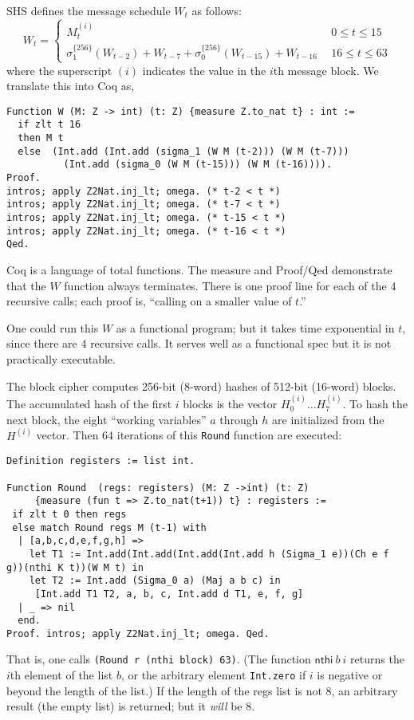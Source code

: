 \documentclass[prodmode,acmtoplas]{acmsmall}
\begin{document}
SHS defines the message schedule $W_t$ as follows:
\[
W_t = \left\{ \begin{array}{ll} M_t^{(i)} & ~~0 \le t \le 15 \\[1ex]
\sigma_1^{\{256\}}(W_{t-2}) + W_{t-7} +
\sigma_0^{\{256\}}(W_{t-15}) + W_{t-16}
      & ~~16 \le t \le 63
\end{array}
\right.
\]
where the superscript $(i)$ indicates
the value in the $i$th message block.
We translate this into Coq as,
\begin{lstlisting}
Function W (M: Z -> int) (t: Z) {measure Z.to_nat t} : int :=
  if zlt t 16 
  then M t 
  else  (Int.add (Int.add (sigma_1 (W M (t-2))) (W M (t-7)))
          (Int.add (sigma_0 (W M (t-15))) (W M (t-16)))).
Proof.
intros; apply Z2Nat.inj_lt; omega. (* t-2 < t *)
intros; apply Z2Nat.inj_lt; omega. (* t-7 < t *)
intros; apply Z2Nat.inj_lt; omega. (* t-15 < t *)
intros; apply Z2Nat.inj_lt; omega. (* t-16 < t *)
Qed.
\end{lstlisting}
Coq is a language of total functions.  The \textsf{measure}
and \textsf{Proof/Qed} demonstrate that the
$W$ function always terminates.  There is one
proof line for each of the 4 recursive calls;
each  proof is, ``calling on a smaller value 
of $t$.''

One could run this $W$ as a functional program;
but it takes time exponential in $t$,
since there are 4 recursive calls.
It serves well as a functional spec
but it is not practically executable.

The block cipher computes 256-bit
(8-word) hashes of 512-bit (16-word)
blocks.  The accumulated hash
of the first $i$ blocks is
the vector $H_0^{(i)}\ldots H_7^{(i)}$.
To hash the next block,
the eight ``working variables'' $a$
through $h$ are initialized
from the $H^{(i)}$ vector.
Then 64 iterations of this \texttt{Round} function
are executed:
\begin{lstlisting}
Definition registers := list int.

Function Round  (regs: registers) (M: Z ->int) (t: Z) 
     {measure (fun t => Z.to_nat(t+1)) t} : registers :=
 if zlt t 0 then regs 
 else match Round regs M (t-1) with
  | [a,b,c,d,e,f,g,h] => 
    let T1 := Int.add(Int.add(Int.add(Int.add h (Sigma_1 e))(Ch e f g))(nthi K t))(W M t) in
    let T2 := Int.add (Sigma_0 a) (Maj a b c) in 
     [Int.add T1 T2, a, b, c, Int.add d T1, e, f, g]
  | _ => nil
  end.
Proof. intros; apply Z2Nat.inj_lt; omega. Qed.
\end{lstlisting}
That is, one calls \lstinline{(Round r (nthi block) 63)}.
(The function $\mathsf{nthi}~b~i$ returns the $i$th element
of the list $b$, or the arbitrary element \lstinline{Int.zero}
if $i$ is negative or beyond the length of the list.)
If the length of the \textsf{regs} list is not 8,
an arbitrary result (the empty list) is returned;
but it \emph{will} be 8.
\end{document}
